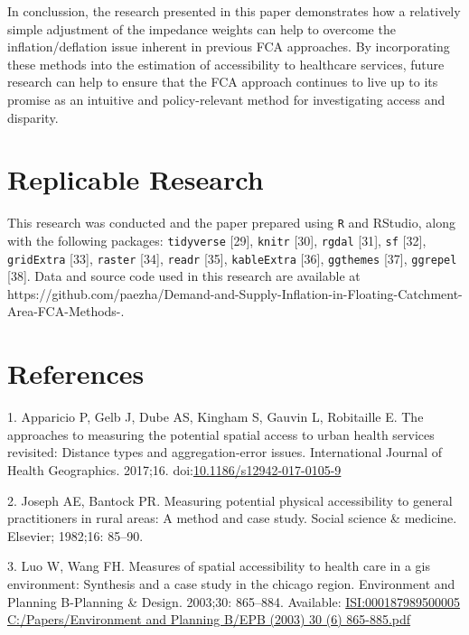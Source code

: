 \documentclass[10pt,letterpaper]{article}
\begin{document}
In conclussion, the research presented in this paper demonstrates how a
relatively simple adjustment of the impedance weights can help to
overcome the inflation/deflation issue inherent in previous FCA
approaches. By incorporating these methods into the estimation of
accessibility to healthcare services, future research can help to ensure
that the FCA approach continues to live up to its promise as an
intuitive and policy-relevant method for investigating access and
disparity.

\section{Replicable Research}\label{replicable-research}

This research was conducted and the paper prepared using \texttt{R} and
RStudio, along with the following packages: \texttt{tidyverse} {[}29{]},
\texttt{knitr} {[}30{]}, \texttt{rgdal} {[}31{]}, \texttt{sf} {[}32{]},
\texttt{gridExtra} {[}33{]}, \texttt{raster} {[}34{]}, \texttt{readr}
{[}35{]}, \texttt{kableExtra} {[}36{]}, \texttt{ggthemes} {[}37{]},
\texttt{ggrepel} {[}38{]}. Data and source code used in this research
are available at
https://github.com/paezha/Demand-and-Supply-Inflation-in-Floating-Catchment-Area-FCA-Methods-.

\section*{References}\label{references}

\hypertarget{refs}{}
\hypertarget{ref-Apparicio2017}{}
1. Apparicio P, Gelb J, Dube AS, Kingham S, Gauvin L, Robitaille E. The
approaches to measuring the potential spatial access to urban health
services revisited: Distance types and aggregation-error issues.
International Journal of Health Geographics. 2017;16.
doi:\href{https://doi.org/10.1186/s12942-017-0105-9}{10.1186/s12942-017-0105-9}

\hypertarget{ref-Joseph1982}{}
2. Joseph AE, Bantock PR. Measuring potential physical accessibility to
general practitioners in rural areas: A method and case study. Social
science \& medicine. Elsevier; 1982;16: 85--90.

\hypertarget{ref-Luo2003}{}
3. Luo W, Wang FH. Measures of spatial accessibility to health care in a
gis environment: Synthesis and a case study in the chicago region.
Environment and Planning B-Planning \& Design. 2003;30: 865--884.
Available:
\href{ISI:000187989500005\%0AC:/Papers/Environment\%20and\%20Planning\%20B/EPB\%20(2003)\%2030\%20(6)\%20865-885.pdf}{ISI:000187989500005
C:/Papers/Environment and Planning B/EPB (2003) 30 (6) 865-885.pdf}
\end{document}
